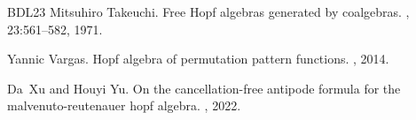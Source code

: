 \documentclass[12pt, reqno]{amsart}
\theoremstyle{definition}
\begin{document}
\begin{thebibliography}{BDL{\etalchar{+}}23}
Mitsuhiro Takeuchi.
\newblock Free {H}opf algebras generated by coalgebras.
, 23:561--582, 1971.

Yannic Vargas.
\newblock Hopf algebra of permutation pattern functions.
, 2014.

Da~Xu and Houyi Yu.
\newblock On the cancellation-free antipode formula for the
  malvenuto-reutenauer hopf algebra.
, 2022.

\end{thebibliography}
\end{document}

